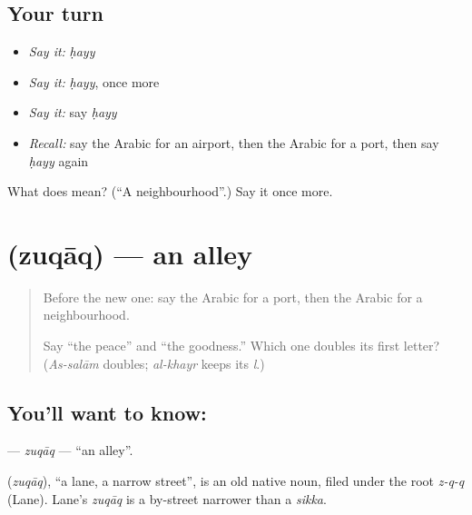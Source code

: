 \subsection*{Your turn}
\begin{itemize}
\raggedright
  \item \emph{Say it:} \emph{ḥayy}
  \item \emph{Say it:} \emph{ḥayy}, once more
  \item \emph{Say it:} say \emph{ḥayy}
  \item \emph{Recall:} say the Arabic for an airport, then the Arabic for a port, then say \emph{ḥayy} again
\end{itemize}

\begin{tcolorbox}[breakable,colback=teal!4,colframe=teal!35!black,title={Before you move on}]
What does  mean? (\textquotedblleft{}A neighbourhood\textquotedblright{}.) Say it once more.
\end{tcolorbox}
\section[\texorpdfstring{\ar{زقاق} (zuqāq)}{زقاق (zuqāq)}]{ (zuqāq) — an alley}

\label{lesson:AR-C101-zuqaq}



\begin{quote}
Before the new one: say the Arabic for a port, then the Arabic for a neighbourhood.

Say \textquotedblleft{}the peace\textquotedblright{} and \textquotedblleft{}the goodness.\textquotedblright{} Which one doubles its first letter? (\emph{As-salām} doubles; \emph{al-khayr} keeps its \emph{l}.)
\end{quote}

\subsection*{You'll want to know: }
\textbf{} — \emph{zuqāq} — \textquotedblleft{}an alley\textquotedblright{}.

\begin{cousinweb}
\textbf{} (\emph{zuqāq}), \textquotedblleft{}a lane, a narrow street\textquotedblright{}, is an old native noun, filed under the root \emph{z-q-q} (Lane). Lane's \emph{zuqāq} is a by-street narrower than a \emph{sikka}.
\end{cousinweb}

